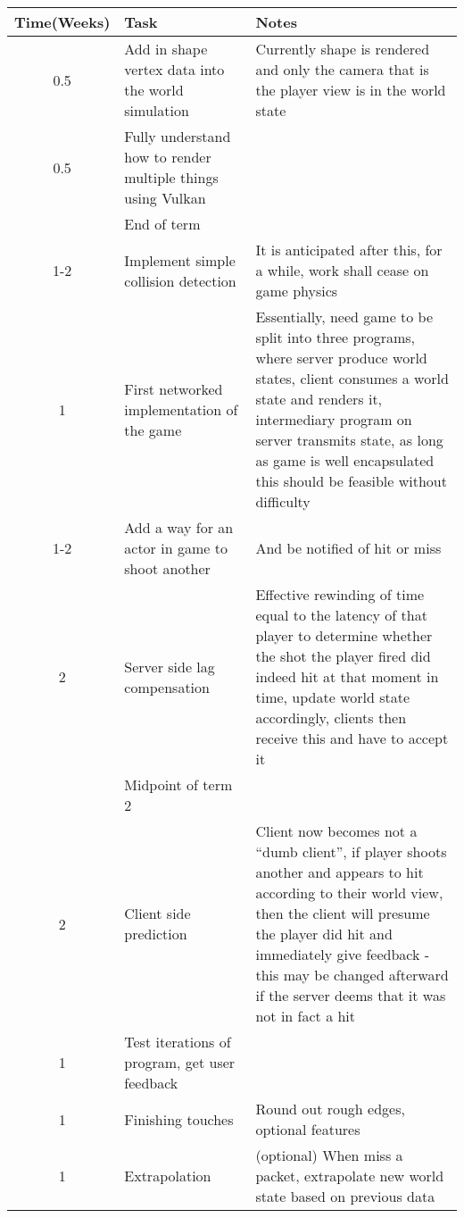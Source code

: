 \documentclass[titlepage]{article}
\begin{document}
	\begin{longtable}{|c p{5.5cm} p{8cm}|}
		\hline
		Time(Weeks) & Task & Notes \\
		\hline\hline\endhead %
		
		0.5 & Add in shape vertex data into the world simulation & Currently shape is rendered and only the camera that is the player view is in the world state \\
		\hline
		0.5 & Fully understand how to render multiple things using Vulkan & \\
		\hline

		& End of term & \\
		\hline

		1-2 & Implement simple collision detection \cite{Petersen} & It is anticipated after this, for a while, work shall cease on game physics \\
		\hline

		1 & First networked implementation of the game & Essentially, need game to be split into three programs, where server produce world states, client consumes a world state and renders it, intermediary program on server transmits state, as long as game is well encapsulated this should be feasible without difficulty \\
		\hline

		1-2 & Add a way for an actor in game to shoot another & And be notified of hit or miss \\
		\hline

		2 & Server side lag compensation & Effective rewinding of time equal to the latency of that player to determine whether the shot the player fired did indeed hit at that moment in time, update world state accordingly, clients then receive this and have to accept it \\
		\hline

		& Midpoint of term 2 & \\
		\hline

		2 & Client side prediction & Client now becomes not a ``dumb client'', if player shoots another and appears to hit according to their world view, then the client will presume the player did hit and immediately give feedback - this may be changed afterward if the server deems that it was not in fact a hit \\
		\hline

		1 & Test iterations of program, get user feedback &  \\
		\hline

		1 & Finishing touches & Round out rough edges, optional features \\
		\hline

		1 & Extrapolation & (optional) When miss a packet, extrapolate new world state based on previous data \\
		\hline
		
	\end{longtable}
\end{document}
